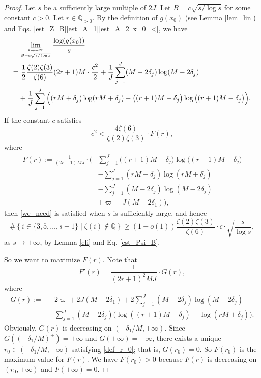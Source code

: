 \documentclass[12pt]{article}
\numberwithin{equation}{section}
\begin{document}
\begin{proof}
Let $s$ be a sufficiently large multiple of $2J$. Let $B = c \sqrt{s/\log s}$ for some constant $c>0$. Let $r \in \mathbb{Q}_{>0}$. By the definition of $g(x_0)$ (see Lemma \ref{lem_lin}) and Eqs. \eqref{est_Z_B}\eqref{est_A_1}\eqref{est_A_2}\eqref{x_0_<}, we have
\begin{align*}
&\lim_{s \to +\infty \atop B=c\sqrt{s/\log s}} \frac{\log(g(x_0))}{s} \\ 
=&~ \frac{1}{2}\frac{\zeta(2)\zeta(3)}{\zeta(6)} (2r+1)M \cdot \frac{c^2}{2} + \frac{1}{J} \sum_{j=1}^{J} (M-2\delta_j)\log(M-2\delta_j) \\
&+ \frac{1}{J} \sum_{j=1}^{J} \Big( (rM+\delta_j)\log(rM+\delta_j) -  \big((r+1)M-\delta_j \big)\log\big((r+1)M-\delta_j \big)  \Big).
\end{align*}
If the constant $c$ satisfies
\begin{equation}\label{we_need_for_c}
c^2 < \frac{4\zeta(6)}{\zeta(2)\zeta(3)} \cdot F(r), 
\end{equation}
where
\begin{align*}
F(r):= \frac{1}{(2r+1)MJ} \cdot \Bigg(  & \sum_{j=1}^{J}  \big((r+1)M-\delta_j\big)\log\big((r+1)M-\delta_j\big) \\
&- \sum_{j=1}^{J} (rM+\delta_j)\log(rM+\delta_j)  \\
&- \sum_{j=1}^{J}  (M-2\delta_j)\log(M-2\delta_j) \\
&+\varpi - J(M-2\delta_1)  \Bigg),  
\end{align*}
then \eqref{we_need} is satisfied when $s$ is sufficiently large, and hence
\begin{equation}\label{lower_bound}
\# \left\{  i \in \{3,5,\ldots,s-1\}  \mid  \zeta(i) \not\in \mathbb{Q} \right\}  \geqslant  (1+o(1)) \frac{\zeta(2)\zeta(3)}{\zeta(6)} \cdot c \cdot \sqrt{\frac{s}{\log s}}, 
\end{equation}
as $s \to +\infty$, by Lemma \ref{eli} and Eq. \eqref{est_Psi_B}.

So we want to maximize $F(r)$. Note that
\[ F'(r) = \frac{1}{(2r+1)^2 MJ} \cdot G(r),  \]
where 
\begin{align*}
	G(r) := &-2\varpi +2J(M-2\delta_1) + 2\sum_{j=1}^{J} (M-2\delta_j)\log(M-2\delta_j) \\
	&- \sum_{j=1}^{J} (M-2\delta_j)\Big( \log((r+1)M-\delta_j) + \log(rM+\delta_j) \Big).
\end{align*}
Obviously, $G(r)$ is decreasing on $(-\delta_1/M, +\infty)$. Since $G((-\delta_1/M)^+) = +\infty$ and $G(+\infty) = -\infty$, there exists a unique $r_0 \in (-\delta_1/M, +\infty)$ satisfying \eqref{def_r_0}; that is, $G(r_0)=0$. So $F(r_0)$ is the maximum value for $F(r)$. We have $F(r_0)>0$ because $F(r)$ is decreasing on $(r_0,+\infty)$ and $F(+\infty) = 0$.


\end{proof}
\end{document}
